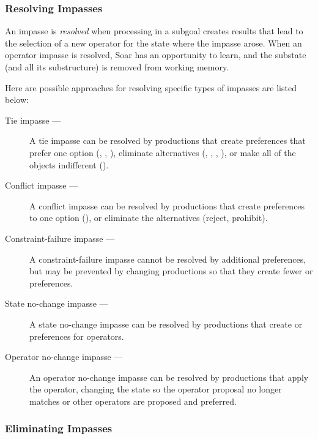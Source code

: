 \subsubsection*{Resolving Impasses}

An impasse is \textit{resolved} when processing in a subgoal creates
results that lead to the selection of a new operator for the state
where the impasse arose. When an operator impasse is resolved, Soar has
an opportunity to learn, and the substate (and all its substructure) is
removed from working memory.

Here are possible approaches for resolving specific types
of impasses are listed below:\vspace{-12pt}
\begin{description}
\item[Tie impasse ---]
	A tie impasse can be resolved by productions that create preferences
	that prefer one option (, , ),
	eliminate alternatives (, , ,
	), or make all of the objects indifferent
	().\vspace{-8pt}
\item[Conflict impasse ---]
	A conflict impasse can be resolved by productions that create
	preferences to  one option (), or
	eliminate the alternatives (reject, prohibit).\vspace{-8pt}
\item[Constraint-failure impasse ---]
	A constraint-failure impasse cannot be resolved by additional
	preferences, but may be prevented by changing productions so that they
	create fewer  or  preferences.\vspace{-8pt}
\item[State no-change impasse ---]
	A state no-change impasse can be resolved by productions that create 
	 or  preferences for operators.\vspace{-
8pt}
\item[Operator no-change impasse ---]
	An operator no-change impasse can be resolved by productions that
	apply the operator, changing the state so the operator proposal
	no longer matches or other operators are proposed and preferred.
\end{description}

\subsubsection*{Eliminating Impasses}

